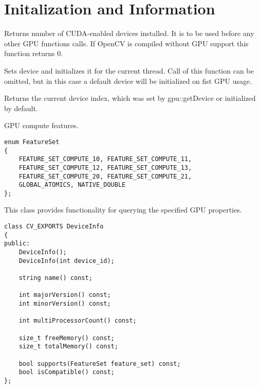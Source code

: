 \section{Initalization and Information}


Returns number of CUDA-enabled devices installed. It is to be used before any other GPU functions calls. If OpenCV is compiled without GPU support this function returns 0. 



Sets device and initializes it for the current thread. Call of this function can be omitted, but in this case a default device will be initialized on fist GPU usage.

\begin{description}
\end{description}


Returns the current device index, which was set by {gpu::getDevice} or initialized by default.



\label{cpp.gpu.FeatureSet}
GPU compute features.

\begin{lstlisting}
enum FeatureSet
{
    FEATURE_SET_COMPUTE_10, FEATURE_SET_COMPUTE_11,
    FEATURE_SET_COMPUTE_12, FEATURE_SET_COMPUTE_13,
    FEATURE_SET_COMPUTE_20, FEATURE_SET_COMPUTE_21,
    GLOBAL_ATOMICS, NATIVE_DOUBLE
};
\end{lstlisting}


This class provides functionality for querying the specified GPU properties. 

\begin{lstlisting}
class CV_EXPORTS DeviceInfo
{
public:
    DeviceInfo();
    DeviceInfo(int device_id);

    string name() const;

    int majorVersion() const;
    int minorVersion() const;

    int multiProcessorCount() const;

    size_t freeMemory() const;
    size_t totalMemory() const;

    bool supports(FeatureSet feature_set) const;
    bool isCompatible() const;
};
\end{lstlisting}


